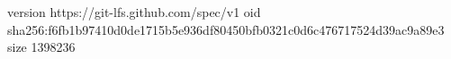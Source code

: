 version https://git-lfs.github.com/spec/v1
oid sha256:f6fb1b97410d0de1715b5e936df80450bfb0321c0d6c476717524d39ac9a89e3
size 1398236
